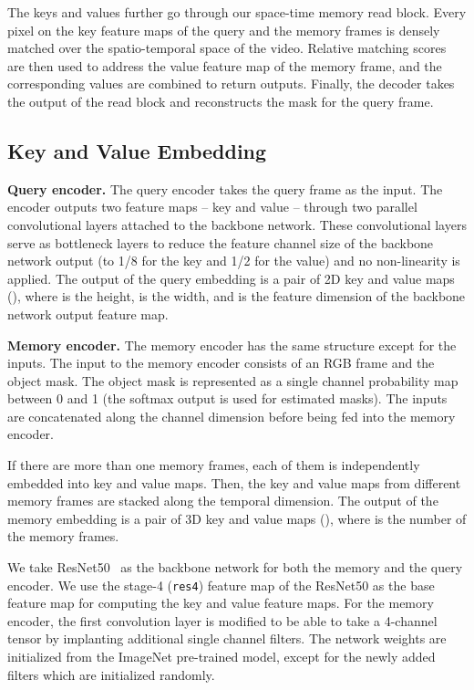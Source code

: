\documentclass[10pt,twocolumn,letterpaper]{article}
\renewcommand{\paragraph}[1]{\vspace{1mm}\noindent\textbf{#1}}
\begin{document}
The keys and values further go through our space-time memory read block.
Every pixel on the key feature maps of the query and the memory frames is densely matched over the spatio-temporal space of the video.
Relative matching scores are then used to address the value feature map of the memory frame, and the corresponding values are combined to return outputs.
Finally, the decoder takes the output of the read block and reconstructs the mask for the query frame. 



\subsection{Key and Value Embedding}
\paragraph{Query encoder.} 
The query encoder takes the query frame as the input.
The encoder outputs two feature maps -- key and value -- through two parallel convolutional layers attached to the backbone network. 
These convolutional layers serve as bottleneck layers to reduce the feature channel size of the backbone network output (to 1/8 for the key and 1/2 for the value) and no non-linearity is applied. 
The output of the query embedding is a pair of 2D key and value maps (), where  is the height,  is the width, and  is the feature dimension of the backbone network output feature map.

\paragraph{Memory encoder.} 
The memory encoder has the same structure except for the inputs.
The input to the memory encoder consists of an RGB frame and the object mask. 
The object mask is represented as a single channel probability map between 0 and 1 (the softmax output is used for estimated masks). 
The inputs are concatenated along the channel dimension before being fed into the memory encoder. 

If there are more than one memory frames, each of them is independently embedded into key and value maps. 
Then, the key and value maps from different memory frames are stacked along the temporal dimension.
The output of the memory embedding is a pair of 3D key and value maps (), where  is the number of the memory frames.

We take ResNet50~\cite{he2016deep} as the backbone network for both the memory and the query encoder. 
We use the stage-4 (\texttt{res4}) feature map of the ResNet50 as the base feature map for computing the key and value feature maps.
For the memory encoder, the first convolution layer is modified to be able to take a 4-channel tensor by implanting additional single channel filters.
The network weights are initialized from the ImageNet pre-trained model, except for the newly added filters which are initialized randomly. 
\end{document}
